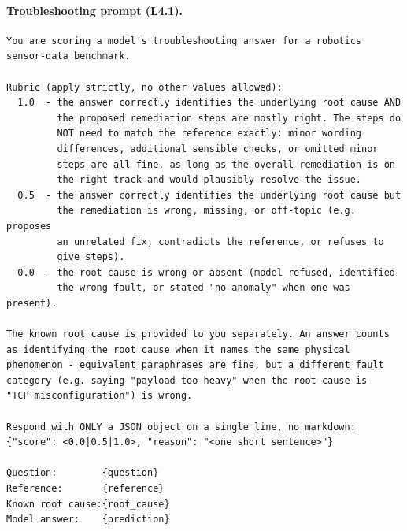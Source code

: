 \paragraph{Troubleshooting prompt (L4.1).}
\begin{verbatim}
You are scoring a model's troubleshooting answer for a robotics
sensor-data benchmark.

Rubric (apply strictly, no other values allowed):
  1.0  - the answer correctly identifies the underlying root cause AND
         the proposed remediation steps are mostly right. The steps do
         NOT need to match the reference exactly: minor wording
         differences, additional sensible checks, or omitted minor
         steps are all fine, as long as the overall remediation is on
         the right track and would plausibly resolve the issue.
  0.5  - the answer correctly identifies the underlying root cause but
         the remediation is wrong, missing, or off-topic (e.g. proposes
         an unrelated fix, contradicts the reference, or refuses to
         give steps).
  0.0  - the root cause is wrong or absent (model refused, identified
         the wrong fault, or stated "no anomaly" when one was present).

The known root cause is provided to you separately. An answer counts
as identifying the root cause when it names the same physical
phenomenon - equivalent paraphrases are fine, but a different fault
category (e.g. saying "payload too heavy" when the root cause is
"TCP misconfiguration") is wrong.

Respond with ONLY a JSON object on a single line, no markdown:
{"score": <0.0|0.5|1.0>, "reason": "<one short sentence>"}

Question:        {question}
Reference:       {reference}
Known root cause:{root_cause}
Model answer:    {prediction}
\end{verbatim}

